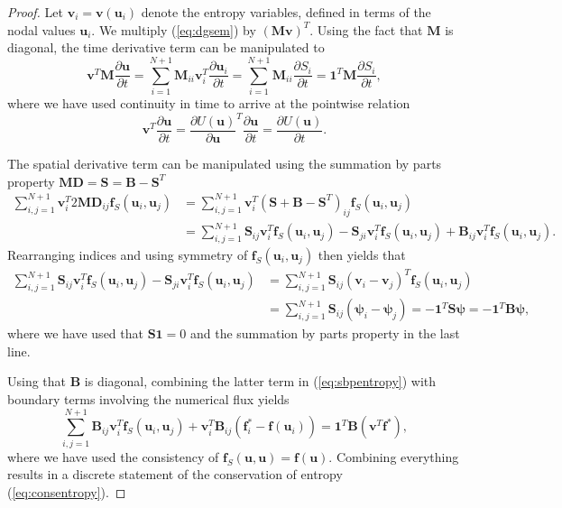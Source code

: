 \documentclass[preprint,10pt]{article}
\theoremstyle{definition}
\theoremstyle{lemma}
\theoremstyle{theorem}
\newcommand{\pd}[2]{\frac{\partial#1}{\partial#2}}
\newcommand{\LRp}[1]{\left( #1 \right)}
\begin{document}
\begin{proof}
Let $\bm{v}_i = \bm{v}(\bm{u}_i)$ denote the entropy variables, defined in terms of the nodal values $\bm{u}_i$.  We multiply (\ref{eq:dgsem}) by $\LRp{\bm{M}\bm{v}}^T$.  
Using the fact that $\bm{M}$ is diagonal, the time derivative term can be manipulated to 
\[
\bm{v}^T\bm{M}\pd{\bm{u}}{t} = \sum_{i=1}^{N+1} \bm{M}_{ii} \bm{v}_i^T \pd{\bm{u}_i}{t} = \sum_{i=1}^{N+1} \bm{M}_{ii} \pd{S_i}{t} = \bm{1}^T\bm{M}\pd{S_i}{t},
\]
where we have used continuity in time to arrive at the pointwise relation 
\[
\bm{v}^T \pd{\bm{u}}{t} = \pd{U(\bm{u})}{\bm{u}}^T \pd{\bm{u}}{t} = \pd{U(\bm{u})}{t}.
\]

The spatial derivative term can be manipulated using the summation by parts property $\bm{M}\bm{D} = \bm{S} = \bm{B}-\bm{S}^T$
\begin{align}
\sum_{i,j=1}^{N+1} \bm{v}_i^T 2 \bm{M}\bm{D}_{ij}\bm{f}_S(\bm{u}_i,\bm{u}_j) &= \sum_{i,j=1}^{N+1} \bm{v}_i^T (\bm{S} + \bm{B} - \bm{S}^T)_{ij}\bm{f}_S(\bm{u}_i,\bm{u}_j) \nonumber\\
&= \sum_{i,j=1}^{N+1} \bm{S}_{ij}\bm{v}_i^T \bm{f}_S(\bm{u}_i,\bm{u}_j) - \bm{S}_{ji}\bm{v}_i^T \bm{f}_S(\bm{u}_i,\bm{u}_j) + \bm{B}_{ij}\bm{v}_i^T \bm{f}_S(\bm{u}_i,\bm{u}_j). \label{eq:sbpentropy}
\end{align}
Rearranging indices and using symmetry of $\bm{f}_S(\bm{u}_i,\bm{u}_j)$ then yields that
\begin{align*}
\sum_{i,j=1}^{N+1} \bm{S}_{ij}\bm{v}_i^T \bm{f}_S(\bm{u}_i,\bm{u}_j) - \bm{S}_{ji}\bm{v}_i^T \bm{f}_S(\bm{u}_i,\bm{u}_j) &= \sum_{i,j=1}^{N+1} \bm{S}_{ij} \LRp{\bm{v}_i - \bm{v}_j}^T\bm{f}_S(\bm{u}_i,\bm{u}_j)\\
&= \sum_{i,j=1}^{N+1} \bm{S}_{ij} \LRp{\bm{\psi}_i-\bm{\psi}_j} = -\bm{1}^T \bm{S}\bm{\psi} = -\bm{1}^T\bm{B}\bm{\psi},
\end{align*}
where we have used that $\bm{S}\bm{1} = 0$ and the summation by parts property in the last line.  

Using that $\bm{B}$ is diagonal, combining the latter term in (\ref{eq:sbpentropy}) with boundary terms involving the numerical flux yields
\[
\sum_{i,j = 1}^{N+1} \bm{B}_{ij}\bm{v}_i^T \bm{f}_S(\bm{u}_i,\bm{u}_j) + \bm{v}_i^T\bm{B}_{ij}\LRp{\bm{f}_i^* - \bm{f}(\bm{u}_i)} = \bm{1}^T\bm{B} \LRp{\bm{v}^T \bm{f}^*},
\]
where we have used the consistency of $\bm{f}_S(\bm{u},\bm{u}) = \bm{f}(\bm{u})$.  Combining everything results in a discrete statement of the conservation of entropy (\ref{eq:consentropy}).   
\end{proof}
\end{document}
